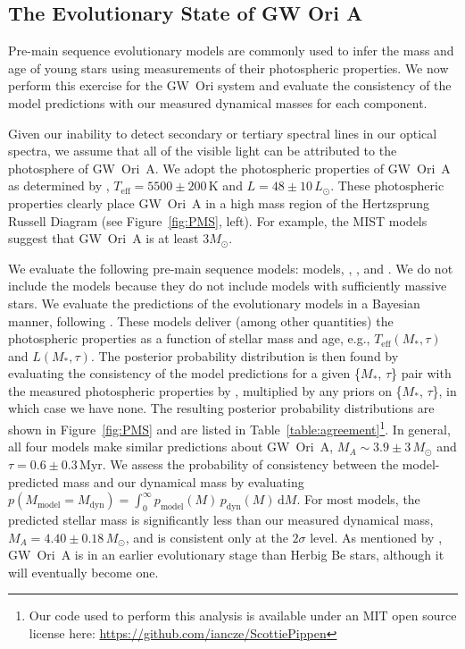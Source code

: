 \documentclass[twocolumn]{aastex61}
\begin{document}
\subsection{The Evolutionary State of GW Ori A}
Pre-main sequence evolutionary models are commonly used to infer the mass and age of young stars using measurements of their photospheric properties. We now perform this exercise for the GW~Ori system and evaluate the consistency of the model predictions with our measured dynamical masses for each component.

Given our inability to detect secondary or tertiary spectral lines in our optical spectra, we assume that all of the visible light can be attributed to the photosphere of GW~Ori~A. We adopt the photospheric properties of GW~Ori~A as determined by \citet{fang14}, $T_\mathrm{eff} = 5500 \pm 200\,\mathrm{K}$ and $L = 48 \pm 10\,L_\odot$. These photospheric properties clearly place GW~Ori~A in a high mass region of the Hertzsprung Russell Diagram (see Figure~\ref{fig:PMS}, left). For example, the MIST models suggest that GW~Ori~A is at least $3 M_\odot$.

We evaluate the following pre-main sequence models: \citet{choi16} models, \citet{dotter08}, \citet{tognelli11}, and \citet{siess00}. We do not include the \citet{baraffe15} models because they do not include models with sufficiently massive stars. We evaluate the predictions of the evolutionary models in a Bayesian manner, following \citet{jorgensen05}. These models deliver (among other quantities) the photospheric properties as a function of stellar mass and age,
e.g., $T_\mathrm{eff}(M_\ast, \tau)$ and $L(M_\ast, \tau)$. The posterior probability distribution is then found by evaluating the consistency of the model predictions for a given \{$M_\ast$, $\tau$\} pair with the measured photospheric properties by \citet{fang14}, multiplied by any priors on  \{$M_\ast$, $\tau$\}, in which case we have none. The resulting posterior probability distributions are shown in Figure~\ref{fig:PMS} and are listed in Table~\ref{table:agreement}\footnote{Our code used to perform this analysis is available under an MIT open source license here: \url{https://github.com/iancze/ScottiePippen}}. In general, all four models make similar predictions about GW~Ori~A, $M_A \sim 3.9 \pm 3\,M_\odot$ and $\tau = 0.6 \pm 0.3\,$Myr. We assess the probability of consistency between the model-predicted mass and our dynamical mass by evaluating $p(M_\mathrm{model} = M_\mathrm{dyn}) = \int_0^\infty p_\mathrm{model}(M) \, p_\mathrm{dyn}(M) \, \mathrm{d}M$. For most models, the predicted stellar mass is significantly less than our measured dynamical mass, $M_A = 4.40 \pm 0.18\,M_\odot$, and is consistent only at the $2\sigma$ level. As mentioned by \citet{fang14}, GW~Ori~A is in an earlier evolutionary stage than Herbig Be stars, although it will eventually become one.
\end{document}
